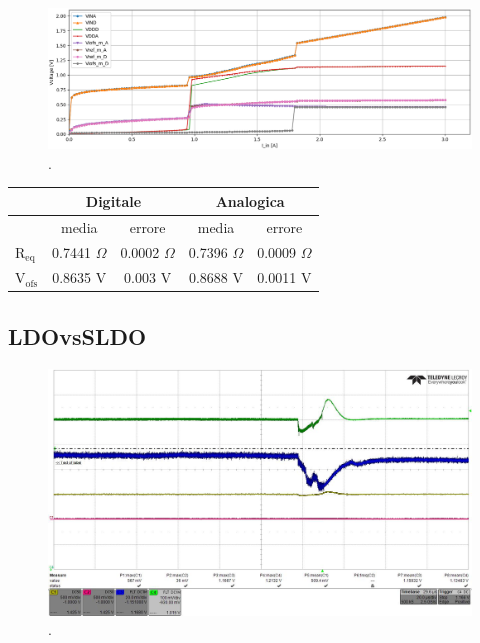 \begin{figure}
\centering
\includegraphics[scale=.3]{Immagini/PUI}
\caption{.}
\label{PUI}
\end{figure}

\begin{center}
\begin{tabular}{|l|c|c|c|c|}
\hline
 & \multicolumn{2}{c|}{Digitale} & \multicolumn{2}{c|}{Analogica} \\ \hline
 
& media & errore & media & errore \\ \hline

$\mathrm{R_{eq}}$ & 0.7441 $\Omega$ & 0.0002 $\Omega$& 0.7396 $\Omega$ & 0.0009 $\Omega$ \\ \hline
$\mathrm{V_{ofs}}$ & 0.8635 V& 0.003 V & 0.8688 V & 0.0011 V\\ \hline      

\end{tabular}
\end{center}



\afterpage{\clearpage}

\subsection{LDOvsSLDO}

\begin{figure}
\centering
\includegraphics[scale=.3]{Immagini/alllin1}
\caption{.}
\label{alllin1}
\end{figure}

